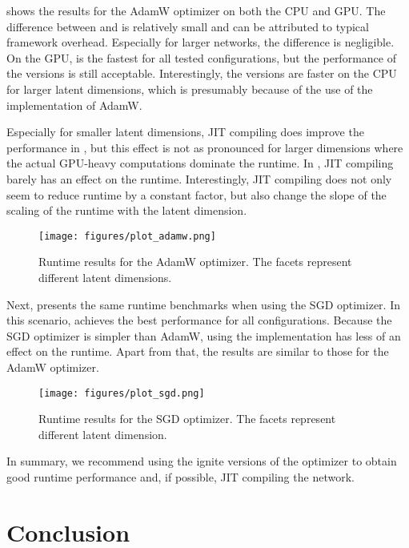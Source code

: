 \documentclass[article]{jss}
\theoremstyle{definition}
\begin{document}
 shows the results for the AdamW optimizer on both the CPU and GPU.
The difference between \torch{} and \mlrttorch{} is relatively small and can be attributed to typical framework overhead.
Especially for larger networks, the difference is negligible.
On the GPU, \pytorch{} is the fastest for all tested configurations, but the performance of the \rlang{} versions is still acceptable.
Interestingly, the \rlang{} versions are faster on the CPU for larger latent dimensions, which is presumably because of the use of the \libtorch{} implementation of AdamW.

Especially for smaller latent dimensions, JIT compiling does improve the performance in \rlang{}, but this effect is not as pronounced for larger dimensions where the actual GPU-heavy computations dominate the runtime.
In \pytorch{}, JIT compiling barely has an effect on the runtime.
Interestingly, JIT compiling does not only seem to reduce runtime by a constant factor, but also change the slope of the scaling of the runtime with the latent dimension.


\begin{figure}[H]
    \centering
    \texttt{[image: figures/plot\_adamw.png]}
    \caption{Runtime results for the AdamW optimizer. The facets represent different latent dimensions.}
    \label{fig:adamw-benchmark}
\end{figure}

Next,  presents the same runtime benchmarks when using the SGD optimizer.
In this scenario, \pytorch{} achieves the best performance for all configurations.
Because the SGD optimizer is simpler than AdamW, using the \libtorch{} implementation has less of an effect on the runtime.
Apart from that, the results are similar to those for the AdamW optimizer.

\begin{figure}[H]
    \centering
    \texttt{[image: figures/plot\_sgd.png]}
    \caption{Runtime results for the SGD optimizer. The facets represent different latent dimension.}
    \label{fig:sgd-benchmark}
\end{figure}

In summary, we recommend using the ignite versions of the optimizer to obtain good runtime performance and, if possible, JIT compiling the network.

\section{Conclusion}\label{sec:conclusion}
\end{document}
